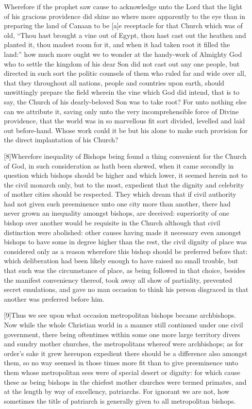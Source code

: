 Wherefore if the prophet saw cause to acknowledge unto  the Lord that the light of his gracious providence did shine no where more apparently to the eye than in preparing the land of Canaan to be [a]e receptacle for that Church which was of old,
 “Thou hast brought a vine out of Egypt, thou hast cast out the heathen and planted it, thou madest room for it, and when it had taken root it filled the land:” how much more ought we to wonder at the handy-work of Almighty God who to settle the kingdom of his dear Son did not cast out any one people, but directed in such sort the politic counsels of them who ruled far and wide over all, that they throughout all nations, people and countries upon earth, should unwittingly prepare the field wherein the vine which God did intend, that is to say, the Church of his dearly-beloved Son was to take root? For unto nothing else can we attribute it, saving only unto the very incomprehensible force of Divine providence, that the world was in so marvellous fit sort divided, levelled and laid out before-hand. Whose work could it be but his alone to make such provision for the direct implantation of his Church?

[8]Wherefore inequality of Bishops being found a thing convenient for the Church of God, in such consideration as hath been shewed, when it came secondly in question which bishops should be higher and which lower, it seemed herein not to the civil monarch only, but to the most, expedient that the dignity and celebrity of mother cities should be respected. They which dream that if civil authority had not given such preeminence unto one city more than another, there had never grown an inequality amongst bishops, are deceived: superiority of one bishop over another would be requisite in the Church although that civil distinction were abolished: other causes having made it necessary even amongst bishops to have some in degree higher than the rest, the civil dignity of place was considered only as a reason wherefore this bishop should be preferred before that: which deliberation had been likely enough to have raised no small trouble,  but that such was the circumstance of place,
 as being followed in that choice, besides the manifest conveniency thereof, took away all show of partiality, prevented secret emulations, and gave no man occasion to think his person disgraced in that another was preferred before him.

[9]Thus we see upon what occasion metropolitan bishops became archbishops. Now while the whole Christian world in a manner still continued under one civil government, there being oftentimes within some one more large territory divers and sundry mother churches, the metropolitans whereof were archbishops; as for order’s sake it grew hereupon expedient there should be a difference also amongst them, so no way seemed in those times more fit than to give preeminence unto them whose metropolitan sees were of special desert or dignity: for which cause these as being bishops in the chiefest mother churches were termed primates, and at the length by way of excellency, patriarchs. For ignorant we are not, how sometimes the title of patriarch is generally given to all metropolitan bishops.

